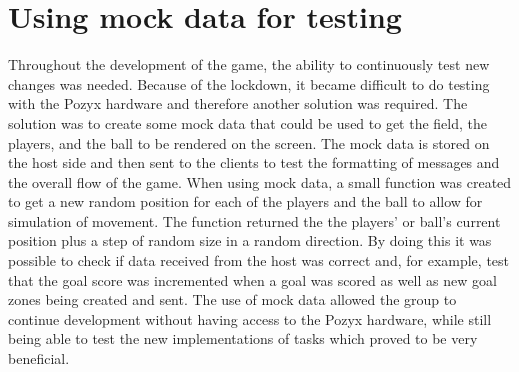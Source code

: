 \section{Using mock data for testing}
Throughout the development of the game, the ability to continuously test new changes was needed.
Because of the lockdown, it became difficult to do testing with the Pozyx hardware and therefore another solution was required.
The solution was to create some mock data that could be used to get the field, the players, and the ball to be rendered on the screen.
The mock data is stored on the host side and then sent to the clients to test the formatting of messages and the overall flow of the game.
When using mock data, a small function was created to get a new random position for each of the players and the ball to allow for simulation of movement.
The function returned the the players' or ball's current position plus a step of random size in a random direction.
By doing this it was possible to check if data received from the host was correct and, for example, test that the goal score was incremented when a goal was scored as well as new goal zones being created and sent.
The use of mock data allowed the group to continue development without having access to the Pozyx hardware, while still being able to test the new implementations of tasks which proved to be very beneficial.